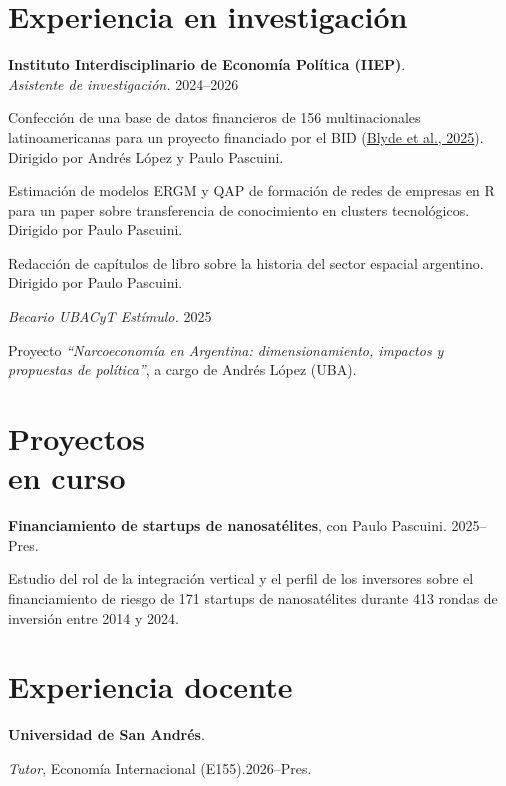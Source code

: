 \documentclass[11pt]{article}
\newcommand{\entrydate}[1]{\hfill{\small{#1}}}
\begin{document}
\section{Experiencia en investigación}
\textbf{Instituto Interdisciplinario de Economía Política (IIEP)}.
\\
\textit{Asistente de investigación.} \entrydate{2024--2026}
\begin{cvitems}
    \item Confección de una base de datos financieros de 156 multinacionales latinoamericanas para un proyecto financiado por el BID (\href{https://publications.iadb.org/es/multilatinas-en-movimiento-caracteristicas-motivaciones-y-lineamientos-de-politica}{Blyde et al., 2025}). Dirigido por Andrés López y Paulo Pascuini.
    \item Estimación de modelos ERGM y QAP de formación de redes de empresas en R para un paper sobre transferencia de conocimiento en clusters tecnológicos. Dirigido por Paulo Pascuini.
    \item Redacción de capítulos de libro sobre la historia del sector espacial argentino. Dirigido por Paulo Pascuini.
\end{cvitems}
\vspace{5pt}
\textit{Becario UBACyT Estímulo.} \entrydate{2025}
\begin{cvitems}
    \item Proyecto \emph{``Narcoeconomía en Argentina: dimensionamiento, impactos y propuestas de política''}, a cargo de Andrés López (UBA).
\end{cvitems}

\section{Proyectos\\en curso}

\textbf{Financiamiento de startups de nanosatélites}, con Paulo Pascuini. \entrydate{2025--Pres.}
\begin{cvitems}
  \item Estudio del rol de la integración vertical y el perfil de los inversores sobre el financiamiento de riesgo de 171 startups de nanosatélites durante 413 rondas de inversión entre 2014 y 2024.
\end{cvitems}

\section{Experiencia docente}
\textbf{Universidad de San Andrés}.
\begin{cvitems}
  \item \textit{Tutor}, Economía Internacional (E155).\entrydate{2026--Pres.}
\end{cvitems}
\end{document}
